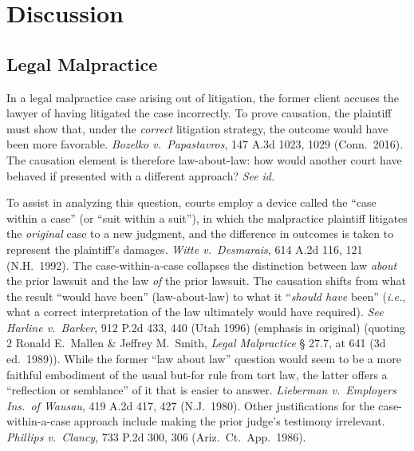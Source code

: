 \documentclass[
  12pt,
  letterpaper,
]{scrartcl}
\begin{document}
\section{Discussion}

\subsection{Legal Malpractice}

In a legal malpractice case arising out of litigation, the former client
accuses the lawyer of having litigated the case incorrectly. To prove
causation, the plaintiff must show that, under the \textit{correct} litigation strategy, the
outcome would have been more favorable. \textit{Bozelko v.~Papastavros}, 147
A.3d 1023, 1029 (Conn.~2016). The causation element is therefore law-about-law:
how would another court have behaved if presented with a different approach? \textit{See} \textit{id.}

To assist in analyzing this question, courts employ a device called the ``case within a
case'' (or ``suit within a suit''), in which the malpractice plaintiff
litigates the \textit{original} case to a new judgment, and the difference in outcomes is
taken to represent the plaintiff's damages. \textit{Witte v.~Desmarais}, 614
A.2d 116, 121 (N.H.~1992). The case-within-a-case collapses the distinction
between law \textit{about} the prior lawsuit and the law \textit{of} the prior
lawsuit. The causation shifts from what the result ``would have
been'' (law-about-law) to what it ``\textit{should have} been'' (\textit{i.e.}, what a correct interpretation of the law ultimately would have required). \textit{See}
\textit{Harline v.~Barker}, 912 P.2d 433, 440 (Utah 1996) (emphasis in
original) (quoting 2 Ronald E.~Mallen \& Jeffrey M.~Smith, \textit{Legal
Malpractice} § 27.7, at 641 (3d ed.~1989)). While the former ``law about law'' question would seem to be a more faithful embodiment of the usual but-for rule
from tort law, the latter offers a ``reflection or semblance'' of it that is easier to answer. \textit{Lieberman v.~Employers Ins.~of
Wausau}, 419 A.2d 417, 427 (N.J.~1980). Other justifications for the
case-within-a-case approach include making the prior judge's testimony
irrelevant. \textit{Phillips v.~Clancy}, 733 P.2d 300, 306
(Ariz.~Ct.~App.~1986).
\end{document}
